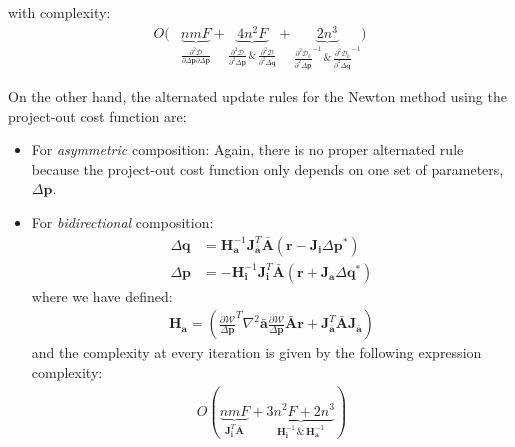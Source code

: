 with complexity:
\begin{equation}
    \begin{aligned}
        O( &
        \underbrace{nmF}_{\frac{\partial^2\mathcal{D}}{\partial\Delta\mathbf{p}\partial\Delta\mathbf{p}}}
        +
        \underbrace{4n^2F}_{\frac{\partial^2\mathcal{D}}{\partial^2\Delta\mathbf{p}} \, \& \, \frac{\partial^2\mathcal{D}}{\partial^2\Delta\mathbf{q}}}
        +
        \underbrace{2n^3}_{\frac{\partial^2 \mathcal{D}_b}{\partial^2 \Delta \mathbf{p}}^{-1} \, \& \, \frac{\partial^2 \mathcal{D}_b}{\partial^2 \Delta \mathbf{q}}^{-1} }
        )
    \label{eq:complexity_alt_bidirectional1_newton}
    \end{aligned}
\end{equation}

On the other hand, the alternated update rules for the Newton method using the project-out cost function are:
\begin{itemize}
	\item For \emph{asymmetric} composition:
	Again, there is no proper alternated rule because the project-out cost function only depends on one set of parameters, $\Delta \mathbf{p}$.
	\item For \emph{bidirectional} composition:
	\begin{equation}
	    \begin{aligned}
	        \Delta \mathbf{q} & = \mathbf{H}_\mathbf{a}^{-1} \mathbf{J}_{\bar{\mathbf{a}}}^T\bar{\mathbf{A}} \left( \mathbf{r} - \mathbf{J}_{\mathbf{i}} \Delta\mathbf{p}^* \right)
	        \\
	        \Delta \mathbf{p} & = -\mathbf{H}_\mathbf{i}^{-1} \mathbf{J}_\mathbf{i}^T \bar{\mathbf{A}} \left( \mathbf{r} + \mathbf{J}_{\mathbf{a}} \Delta\mathbf{q}^* \right)
	    \label{eq:bidirectional_alternated_po_solution}
	    \end{aligned}
	\end{equation}
	where we have defined:
	\begin{equation}
	    \begin{aligned}
	        \mathbf{H}_\mathbf{a} = \left( \frac{\partial \mathcal{W}}{\Delta \mathbf{p}}^T \nabla^2\bar{\mathbf{a}} \frac{\partial \mathcal{W}}{\Delta \mathbf{p}}\bar{\mathbf{A}}\mathbf{r} + \mathbf{J}_{\bar{\mathbf{a}}}^T\bar{\mathbf{A}}\mathbf{J}_{\bar{\mathbf{a}}} \right)
	    \label{eq:po_hessian_q}
	    \end{aligned}
	\end{equation}
	and the complexity at every iteration is given by the following expression complexity:
	\begin{equation}
	    \begin{aligned}
	        O(
	        \underbrace{nmF}_{\mathbf{J}_\mathbf{i}^T \bar{\mathbf{A}}}
	        +
	        \underbrace{3n^2F + 2n^3}_{
                \mathbf{H}_\mathbf{i}^{-1}
                 \, \& \,
                 \mathbf{H}_\mathbf{a}^{-1}
                 }
	        )
	    \label{eq:complexity_po_alt_bidirectional_newton}
	    \end{aligned}
	\end{equation}
\end{itemize}


